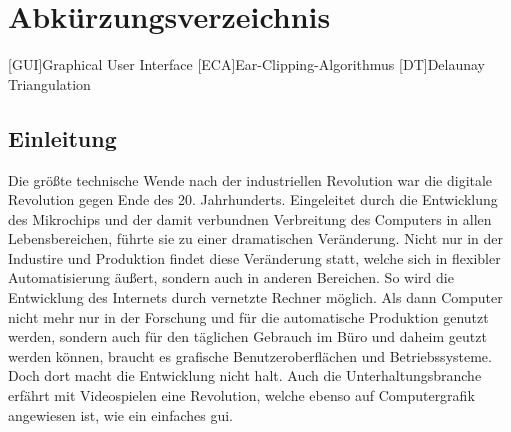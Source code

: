 \documentclass[12pt, twoside]{article}
\begin{document}

\section*{Abkürzungsverzeichnis}
\begin{acronym}
    [GUI]{Graphical User Interface}
    [ECA]{Ear-Clipping-Algorithmus}
    [DT]{Delaunay Triangulation}
    
\end{acronym}
\pagebreak


\begin{onehalfspacing}

  \section{Einleitung}
  
  Die größte technische Wende nach der industriellen Revolution war die digitale Revolution gegen Ende des 20. Jahrhunderts.\cite{digrev}
  Eingeleitet durch die Entwicklung des Mikrochips und der damit verbundnen Verbreitung des Computers in allen Lebensbereichen, führte sie 
  zu einer dramatischen Veränderung. Nicht nur in der Industire und Produktion findet diese Veränderung statt, welche sich in flexibler Automatisierung äußert,
  sondern auch in anderen Bereichen. So wird die Entwicklung des Internets durch vernetzte Rechner möglich.
  Als dann Computer nicht mehr nur in der Forschung und für die automatische Produktion genutzt werden, sondern auch für den täglichen Gebrauch im Büro und 
  daheim geutzt werden können, braucht es grafische Benutzeroberflächen und Betriebssysteme. Doch dort macht die Entwicklung nicht halt.
  Auch die Unterhaltungsbranche erfährt mit Videospielen eine Revolution, welche ebenso auf Computergrafik angewiesen ist, wie ein einfaches \ac{gui}.
  

\end{onehalfspacing}
\end{document}
